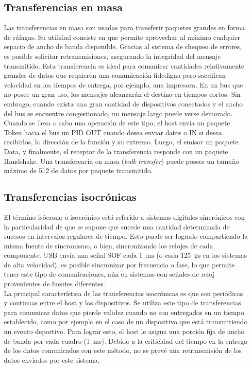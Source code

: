 \subsection{Transferencias en masa}
	Las transferencias en masa son usadas para transferir paquetes grandes en forma de ráfagas. Su utilidad consiste en que permite aprovechar al máximo cualquier espacio de ancho de banda disponible. Gracias al sistema de chequeo de errores, es posible solicitar retransmisiones, asegurando la integridad del mensaje transmitido. Esta transferencia es ideal para comunicar cantidades relativamente grandes de datos que requieren una comunicación fidedigna pero sacrifican velocidad en los tiempos de entrega, por ejemplo, una impresora. En un bus que no posee un gran uso, los mensajes alcanzarán el destino en tiempos cortos. Sin embrago, cuando exista una gran cantidad de dispositivos conectados y el ancho del bus se encuentre congestionado, un mensaje largo puede verse demorado.\\

	Cuando se lleva a cabo una operación de este tipo, el host envía un paquete Token hacia el bus un PID OUT cuando desea enviar datos o IN si desea recibirlos, la dirección de la función y su extremo. Luego, el emisor un paquete Data, y finalmente, el receptor de la transferencia responde con un paquete Handshake. Una transferencia en masa ({\it bulk transfer}) puede poseer un tamaño máximo de \SI{512}{\byte} de datos por paquete transmitido.
	
\subsection{Transferencias isocrónicas}
	El término isócrono o isocrónico está referido a sistemas digitales sincrónicos con la particularidad de que se supone que sucede una cantidad determinada de sucesos en intervalos regulares de tiempo. Esto puede ser logrado compartiendo la misma fuente de sincronismo, o bien, sincronizando los relojes de cada componente. USB envía una señal SOF cada \SI{1}{\milli\second} (o cada \SI{125}{\micro\second} en los sistemas de alta velocidad), es posible sincronizar por frecuencia o fase, lo que permite tener este tipo de comunicaciones, aún en sistemas con señales de reloj provenientes de fuentes diferentes.\\
	
	La principal característica de las transferencias isocrónicas es que son periódicas y continuas entre el host y los dispositivos. Se utiliza este tipo de transferencias para comunicar datos que pierde validez cuando no son entregados en un tiempo establecido, como por ejemplo en el caso de un dispositivo que está transmitiendo un evento deportivo. Para lograr esto, el host le asigna una porción fija de ancho de banda por cada cuadro (\SI{1}{\milli\second}). Debido a la criticidad del tiempo en la entrega de los datos comunicados con este método, no se prevé una retransmisión de los datos enviados por este sistema.\\
	
